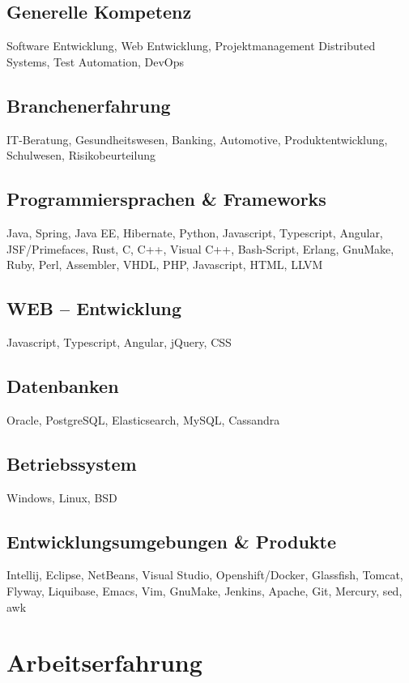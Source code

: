 \documentclass[fontsize=10pt]{tccv}
\begin{document}
\subsection{Generelle Kompetenz}
Software Entwicklung,
Web Entwicklung,
Projektmanagement
Distributed Systems,
Test Automation,
DevOps

\subsection{Branchenerfahrung}
IT-Beratung,
Gesundheitswesen,
Banking,
Automotive,
Produktentwicklung,
Schulwesen,
Risikobeurteilung

\subsection{Programmiersprachen \& Frameworks}
Java, Spring, Java EE, Hibernate, Python, Javascript, Typescript,
Angular, JSF/Primefaces, Rust, C, C++,
Visual C++, Bash-Script, Erlang, GnuMake, Ruby, Perl,
Assembler, VHDL, PHP, Javascript, HTML, LLVM

\subsection{WEB – Entwicklung}
Javascript, Typescript, Angular, jQuery, CSS

\subsection{Datenbanken}
Oracle, PostgreSQL, Elasticsearch, MySQL, Cassandra

\subsection{Betriebssystem}
Windows, Linux, BSD

\subsection{Entwicklungsumgebungen \& Produkte}
Intellij, Eclipse, NetBeans, Visual Studio, Openshift/Docker, Glassfish, Tomcat, Flyway,
Liquibase, Emacs, Vim, GnuMake,
Jenkins, Apache, Git, Mercury, sed, awk

\newpage

\section{Arbeitserfahrung}
\end{document}
